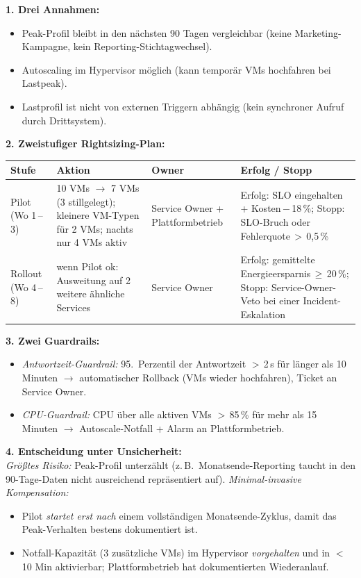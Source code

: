 \documentclass[11pt,a4paper,oneside]{article}
\begin{document}
\begin{loesungbox}
\textbf{1. Drei Annahmen:}
\begin{itemize}
  \item Peak-Profil bleibt in den n\"achsten 90 Tagen vergleichbar (keine Marketing-Kampagne, kein Reporting-Stichtag\-wechsel).
  \item Autoscaling im Hypervisor m\"oglich (kann tempor\"ar VMs hochfahren bei Lastpeak).
  \item Lastprofil ist nicht von externen Triggern abh\"angig (kein synchroner Aufruf durch Drittsystem).
\end{itemize}

\smallskip
\textbf{2. Zweistufiger Rightsizing-Plan:}

\smallskip
\begin{tabularx}{\linewidth}{@{}p{2.2cm}p{4.0cm}p{2.6cm}X@{}}
\toprule
\textbf{Stufe} & \textbf{Aktion} & \textbf{Owner} & \textbf{Erfolg / Stopp} \\
\midrule
Pilot (Wo 1\,--\,3)   & 10 VMs $\rightarrow$ 7 VMs (3 stillgelegt); kleinere VM-Typen f\"ur 2 VMs; nachts nur 4 VMs aktiv & Service Owner + Plattformbetrieb & Erfolg: SLO eingehalten + Kosten\,$-$\,18\,\%; Stopp: SLO-Bruch oder Fehlerquote\,$>$\,0,5\,\% \\
Rollout (Wo 4\,--\,8) & wenn Pilot ok: Ausweitung auf 2 weitere \"ahnliche Services & Service Owner & Erfolg: gemittelte Energieersparnis\,$\geq$\,20\,\%; Stopp: Service-Owner-Veto bei einer Incident-Eskalation \\
\bottomrule
\end{tabularx}

\smallskip
\textbf{3. Zwei Guardrails:}
\begin{itemize}
  \item \emph{Antwortzeit-Guardrail:} 95.\ Perzentil der Antwortzeit $>$\,2\,s f\"ur l\"anger als 10 Minuten $\rightarrow$ automatischer Rollback (VMs wieder hochfahren), Ticket an Service Owner.
  \item \emph{CPU-Guardrail:} CPU \"uber alle aktiven VMs $>$\,85\,\% f\"ur mehr als 15 Minuten $\rightarrow$ Autoscale-Notfall + Alarm an Plattformbetrieb.
\end{itemize}

\smallskip
\textbf{4. Entscheidung unter Unsicherheit:}\\
\emph{Gr\"o{\ss}tes Risiko:} Peak-Profil unterz\"ahlt (z.\,B.\ Monatsende-Reporting taucht in den 90-Tage-Daten nicht ausreichend repr\"asentiert auf). \emph{Minimal-invasive Kompensation:}
\begin{itemize}
  \item Pilot \emph{startet erst nach} einem vollst\"andigen Monatsende-Zyklus, damit das Peak-Verhalten bestens dokumentiert ist.
  \item Notfall-Kapazit\"at (3 zus\"atzliche VMs) im Hypervisor \emph{vorgehalten} und in $<$\,10 Min aktivierbar; Plattformbetrieb hat dokumentierten Wiederanlauf.
\end{itemize}
\end{loesungbox}
\end{document}
